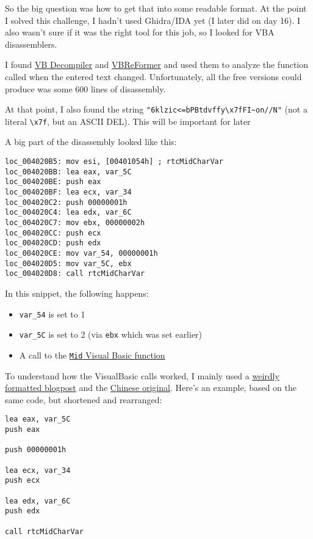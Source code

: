 \documentclass[11pt]{article}
\providecommand{\tightlist}{%
      \setlength{\itemsep}{0pt}\setlength{\parskip}{0pt}}
\begin{document}
So the big question was how to get that into some readable format. At
the point I solved this challenge, I hadn't used Ghidra/IDA yet (I later
did on day 16). I also wasn't sure if it was the right tool for this
job, so I looked for VBA disassemblers.

I found \href{https://www.vb-decompiler.org/}{VB Decompiler} and
\href{https://qiil.io/}{VBReFormer} and used them to analyze the
function called when the entered text changed. Unfortunately, all the
free versions could produce was some 600 lines of disassembly.

At that point, I also found the string
\texttt{"6klzic\textless{}=bPBtdvff\textquotesingle{}y\textbackslash{}x7fFI\textasciitilde{}on//N"}
(not a literal \texttt{\textbackslash{}x7f}, but an ASCII DEL). This
will be important for later

A big part of the disassembly looked like this:

\begin{verbatim}
loc_004020B5: mov esi, [00401054h] ; rtcMidCharVar
loc_004020BB: lea eax, var_5C
loc_004020BE: push eax
loc_004020BF: lea ecx, var_34
loc_004020C2: push 00000001h
loc_004020C4: lea edx, var_6C
loc_004020C7: mov ebx, 00000002h
loc_004020CC: push ecx
loc_004020CD: push edx
loc_004020CE: mov var_54, 00000001h
loc_004020D5: mov var_5C, ebx
loc_004020D8: call rtcMidCharVar
\end{verbatim}

In this snippet, the following happens:

\begin{itemize}
\tightlist
\item
  \texttt{var\_54} is set to 1
\item
  \texttt{var\_5C} is set to 2 (via \texttt{ebx} which was set earlier)
\item
  A call to the
  \href{https://docs.microsoft.com/en-us/office/vba/language/reference/user-interface-help/mid-function}{\texttt{Mid}
  Visual Basic function}
\end{itemize}

To understand how the VisualBasic calls worked, I mainly used a
\href{https://hvoidcode.wordpress.com/2016/02/06/vb-function-description-for-reversing/}{weirdly
formatted blogpost} and the
\href{https://blog.csdn.net/weixin_30736301/article/details/95964460}{Chinese
original}. Here's an example, based on the same code, but shortened and
rearranged:

\begin{verbatim}
lea eax, var_5C
push eax

push 00000001h

lea ecx, var_34
push ecx

lea edx, var_6C
push edx

call rtcMidCharVar
\end{verbatim}
\end{document}
